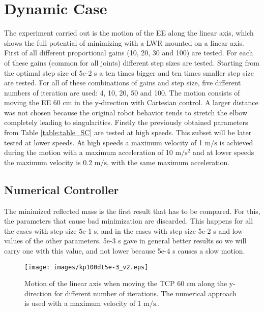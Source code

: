 \section{Dynamic Case}
\label{sec:dynamic_case}


The  experiment carried out is the motion of the EE along the linear axis, which shows the full potential of minimizing with a LWR mounted on a linear axis.
First of all different proportional gains (10, 20, 30 and 100) are tested. For each of these gains (common for all joints) different step sizes are tested. Starting from the optimal step size of 5e-2 s a ten times bigger and ten times smaller step size are tested. For all of these combinations of gains and step size, five different numbers of iteration are used: 4, 10, 20, 50 and 100.
The motion consists of moving the EE 60 cm  in the y-direction with Cartesian control.
A larger distance was not chosen  because the original robot behavior tends to stretch the elbow completely  leading to singularities. 
 Firstly the previously obtained  parameters from Table 	\ref{table:table_SC} are tested at high speeds. This subset will be later tested at lower speeds. At high speeds a maximum velocity of 1 $\mathrm{m/s}$ is achieved during the motion with a maximum acceleration of 10 $\mathrm{m/s^{2}}$ and at lower speeds the maximum velocity is 0.2 $\mathrm{m/s}$, with the same maximum acceleration.





\subsection{Numerical Controller}




The minimized reflected mass is the first result that has to be compared. For this, the parameters that cause bad minimization are discarded. This happens for all the cases with step size 5e-1 s, and in the cases with step size  5e-2 s and low values of the other parameters. 5e-3 s gave in general better results so we will carry one with this value, and not lower because 5e-4 s causes a  slow motion.
\begin{figure}[!htb]
	\centerline{
		\texttt{[image: images/kp100dt5e-3\_v2.eps]}}
	\caption{Motion of the linear axis when moving the TCP 60 cm along the y-direction for different number of iterations. The numerical approach is used with a maximum velocity of 1 $\mathrm{m/s}$..}
	\label{fig:kp100dt5e-3}
\end{figure}

